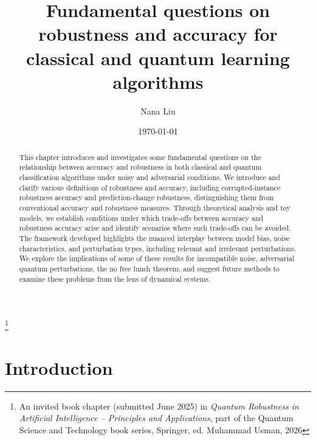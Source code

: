 \documentclass[onecolumn,prx, superscriptaddress,longbibliography,margin=1mm 11pt]{revtex4-2}
\begin{document}
\title{Fundamental questions on robustness and accuracy for classical and quantum learning algorithms}  \thanks{An invited book chapter (submitted June 2025) in \textit{Quantum Robustness in Artificial Intelligence -- Principles and Applications}, part of the Quantum Science and Technology book series, Springer, ed. Muhammad Usman, 2026}


\author{Nana Liu}



\date{\today}



\begin{abstract}
 This chapter introduces and investigates some fundamental questions on the relationship between accuracy and robustness in both classical and quantum classification algorithms under noisy and adversarial conditions. We introduce and clarify various definitions of robustness and accuracy, including corrupted-instance robustness accuracy and prediction-change robustness, distinguishing them from conventional accuracy and robustness measures. Through theoretical analysis and toy models, we establish conditions under which trade-offs between accuracy and robustness accuracy arise and identify scenarios where such trade-offs can be avoided. The framework developed highlights the nuanced interplay between model bias, noise characteristics, and perturbation types, including relevant and irrelevant perturbations. We explore the implications of some of these results for incompatible noise, adversarial quantum perturbations, the no free lunch theorem, and suggest future methods to examine these problems from the lens of dynamical systems. 
\end{abstract}

\maketitle
\section{Introduction}
\end{document}
